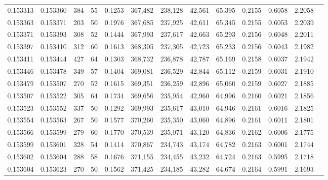 \begin{tabular}{rrrrrrrrrrrrr}
0.153313 & 0.153360 &   384 &  55 &                                     0.1253 & 367,482 & 238,128 &  42,561 &  65,395 & 0.2155 & 0.6058 & 2.2058 \\
0.153363 & 0.153371 &   203 &  50 &                                     0.1976 & 367,685 & 237,925 &  42,611 &  65,345 & 0.2155 & 0.6053 & 2.2039 \\
0.153371 & 0.153393 &   308 &  52 &                                     0.1444 & 367,993 & 237,617 &  42,663 &  65,293 & 0.2156 & 0.6048 & 2.2011 \\
0.153397 & 0.153410 &   312 &  60 &                                     0.1613 & 368,305 & 237,305 &  42,723 &  65,233 & 0.2156 & 0.6043 & 2.1982 \\
0.153411 & 0.153444 &   427 &  64 &                                     0.1303 & 368,732 & 236,878 &  42,787 &  65,169 & 0.2158 & 0.6037 & 2.1942 \\
0.153446 & 0.153478 &   349 &  57 &                                     0.1404 & 369,081 & 236,529 &  42,844 &  65,112 & 0.2159 & 0.6031 & 2.1910 \\
0.153479 & 0.153507 &   270 &  52 &                                     0.1615 & 369,351 & 236,259 &  42,896 &  65,060 & 0.2159 & 0.6027 & 2.1885 \\
0.153507 & 0.153522 &   305 &  64 &                                     0.1734 & 369,656 & 235,954 &  42,960 &  64,996 & 0.2160 & 0.6021 & 2.1856 \\
0.153523 & 0.153552 &   337 &  50 &                                     0.1292 & 369,993 & 235,617 &  43,010 &  64,946 & 0.2161 & 0.6016 & 2.1825 \\
0.153554 & 0.153563 &   267 &  50 &                                     0.1577 & 370,260 & 235,350 &  43,060 &  64,896 & 0.2161 & 0.6011 & 2.1801 \\
0.153566 & 0.153599 &   279 &  60 &                                     0.1770 & 370,539 & 235,071 &  43,120 &  64,836 & 0.2162 & 0.6006 & 2.1775 \\
0.153599 & 0.153601 &   328 &  54 &                                     0.1414 & 370,867 & 234,743 &  43,174 &  64,782 & 0.2163 & 0.6001 & 2.1744 \\
0.153602 & 0.153604 &   288 &  58 &                                     0.1676 & 371,155 & 234,455 &  43,232 &  64,724 & 0.2163 & 0.5995 & 2.1718 \\
0.153604 & 0.153623 &   270 &  50 &                                     0.1562 & 371,425 & 234,185 &  43,282 &  64,674 & 0.2164 & 0.5991 & 2.1693 \\

\end{tabular}
